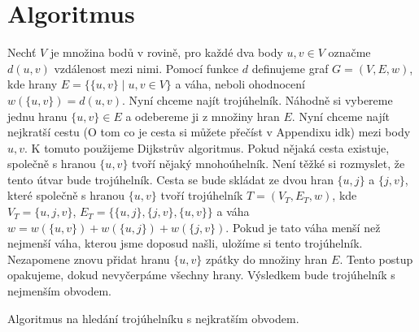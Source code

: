 \section{Algoritmus}
\label{sec:algoritmus}

Nechť $V$ je množina bodů v rovině, pro každé dva body $u, v \in V$ označme $d(u, v)$ vzdálenost mezi nimi. Pomocí funkce $d$ definujeme graf $G = (V, E, w)$, kde hrany $E = \{\{u, v\} \mid u, v \in V\}$ a váha, neboli ohodnocení $w(\{u, v\}) = d(u, v)$. Nyní chceme najít trojúhelník. Náhodně si vybereme jednu hranu $\{u, v\} \in E$ a odebereme ji z množiny hran $E$. Nyní chceme najít nejkratší cestu (O tom co je cesta si můžete přečíst v Appendixu idk) mezi body $u, v$. K tomuto použijeme Dijkstrův algoritmus. Pokud nějaká cesta existuje, společně s hranou $\{u, v\}$ tvoří nějaký mnohoúhelník. Není těžké si rozmyslet, že tento útvar bude trojúhelník. Cesta se bude skládat ze dvou hran $\{u, j\}$ a $\{j, v\}$, které společně s hranou $\{u, v\}$ tvoří trojúhelník $T = (V_T, E_T, w)$, kde $V_T = \{u, j, v\}$, $E_T = \{\{u,j\}, \{j,v\}, \{u,v\}\}$ a váha $w = w(\{u, v\}) + w(\{u, j\}) + w(\{j, v\})$. Pokud je tato váha menší než nejmenší váha, kterou jsme doposud našli, uložíme si tento trojúhelník. Nezapomene znovu přidat hranu $\{u, v\}$ zpátky do množiny hran $E$. Tento postup opakujeme, dokud nevyčerpáme všechny hrany. Výsledkem bude trojúhelník s nejmenším obvodem.



\begin{algorithm}
    \caption{Algoritmus na hledání trojúhelníku s nejkratším obvodem.}
    \label{alg:algoritmus}
   
   
    \BlankLine
    \;
   \end{algorithm}